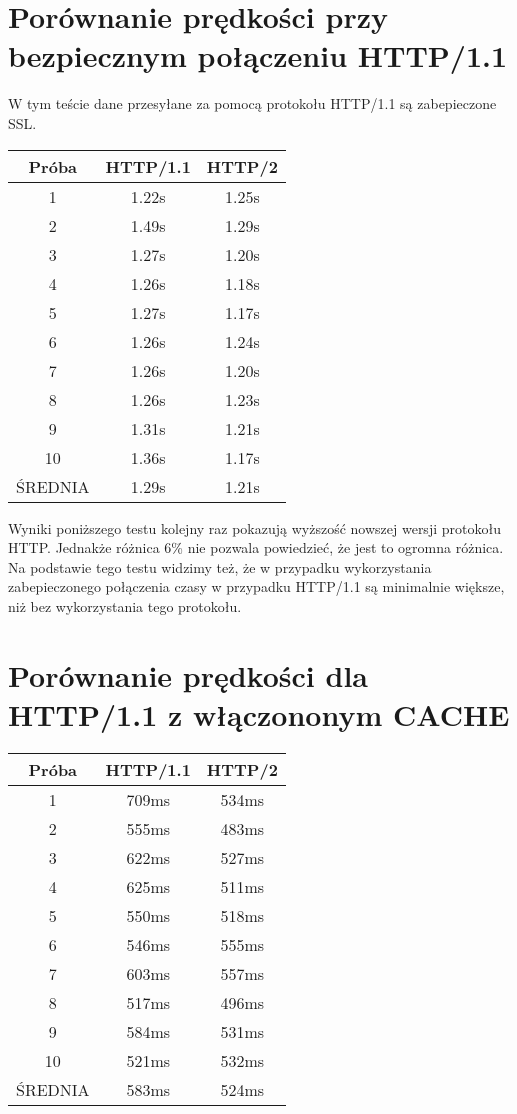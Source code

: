 \documentclass[a4paper,12pt,twoside,openany]{report}
\begin{document}
\section{Porównanie prędkości przy bezpiecznym połączeniu HTTP/1.1}

W tym teście dane przesyłane za pomocą protokołu HTTP/1.1 są zabepieczone SSL.

\begin{tabular}{c|c|c}
Próba & HTTP/1.1 & HTTP/2 \\ \hline
1 & 1.22s & 1.25s \\
2 & 1.49s & 1.29s \\
3 & 1.27s & 1.20s \\
4 & 1.26s & 1.18s \\
5 & 1.27s & 1.17s \\
6 & 1.26s & 1.24s \\
7 & 1.26s & 1.20s \\
8 & 1.26s & 1.23s \\
9 & 1.31s & 1.21s \\
10 & 1.36s & 1.17s\\ \hline
ŚREDNIA & 1.29s & 1.21s \\
\end{tabular}

Wyniki poniższego testu kolejny raz pokazują wyższość nowszej wersji protokołu HTTP.
Jednakże różnica 6\% nie pozwala powiedzieć, że jest to ogromna różnica.
Na podstawie tego testu widzimy też, że w przypadku wykorzystania zabepieczonego połączenia czasy w przypadku HTTP/1.1 są minimalnie większe, niż bez wykorzystania tego protokołu.

\section{Porównanie prędkości dla HTTP/1.1 z włączononym CACHE}

\begin{tabular}{c|c|c}
Próba & HTTP/1.1 & HTTP/2 \\ \hline
1 & 709ms & 534ms \\
2 & 555ms & 483ms \\
3 & 622ms & 527ms \\
4 & 625ms & 511ms \\
5 & 550ms & 518ms \\
6 & 546ms & 555ms \\
7 & 603ms & 557ms \\
8 & 517ms & 496ms \\
9 & 584ms & 531ms \\
10 & 521ms & 532ms \\ \hline
ŚREDNIA & 583ms & 524ms \\
\end{tabular}
\end{document}
